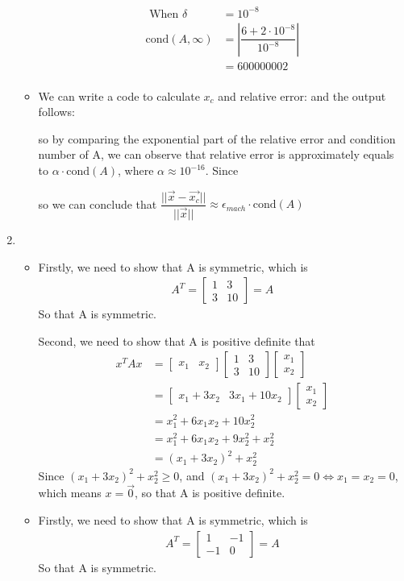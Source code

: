 \documentclass{article}
\begin{document}
\begin{enumerate}
\begin{itemize}
\begin{align*}
\mbox{ When }\delta &=10^{-8}\\
\mbox{cond}(A,\infty)&=\left|\dfrac{6+2\cdot 10^{-8}}{ 10^{-8}}\right|\\&=600000002\\
\end{align*}
\item
We can write a code to calculate $x_c$ and relative error: 
and the output follows:

so by comparing the exponential part of the relative error and condition number of A, we can observe that relative error is approximately equals to $\alpha\cdot \mbox{cond}(A)$, where $\alpha\approx 10^{-16}$.
Since

so we can conclude that $\dfrac{||\vec{x} - \vec{x_c}||}{||\vec{x}||} \approx \epsilon_{mach}\cdot \mbox{cond}(A)$
\end{itemize}
\item
\begin{itemize}
\item
Firstly, we need to show that A is symmetric, which is \begin{align*}
A^T = \begin{bmatrix}
1&3\\3&10
\end{bmatrix} =A
\end{align*}
So that A is symmetric.

Second, we need to show that A is positive definite that \begin{align*}
x^TAx&=\begin{bmatrix}
x_1&x_2
\end{bmatrix}\begin{bmatrix}
1&3\\3&10
\end{bmatrix}\begin{bmatrix}
x_1\\x_2
\end{bmatrix}\\
&=\begin{bmatrix}
x_1+3x_2&3x_1+10x_2
\end{bmatrix}\begin{bmatrix}
x_1\\x_2
\end{bmatrix}\\
&=x_1^2+6x_1x_2+10x_2^2\\
&=x_1^2+6x_1x_2+9x_2^2+x_2^2\\
&=(x_1+3x_2)^2+x_2^2 
\end{align*}
Since $(x_1+3x_2)^2+x_2^2 \geq 0$, and $(x_1+3x_2)^2+x_2^2 = 0 \iff x_1=x_2 =0$, which means $x=\vec{0}$, so that A is positive definite.
\item
Firstly, we need to show that A is symmetric, which is \begin{align*}
A^T = \begin{bmatrix}
1&-1\\-1&0
\end{bmatrix} =A
\end{align*}
So that A is symmetric.


\end{itemize}
\end{enumerate}
\end{document}
